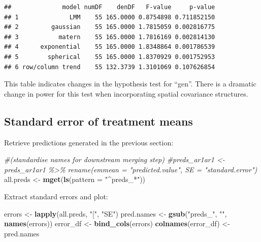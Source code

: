 \documentclass[
]{book}
\newenvironment{Shaded}{\begin{snugshade}}{\end{snugshade}}
\newcommand{\AttributeTok}[1]{\textcolor[rgb]{0.13,0.29,0.53}{#1}}
\newcommand{\CommentTok}[1]{\textcolor[rgb]{0.56,0.35,0.01}{\textit{#1}}}
\newcommand{\FunctionTok}[1]{\textcolor[rgb]{0.13,0.29,0.53}{\textbf{#1}}}
\newcommand{\NormalTok}[1]{#1}
\newcommand{\OtherTok}[1]{\textcolor[rgb]{0.56,0.35,0.01}{#1}}
\newcommand{\StringTok}[1]{\textcolor[rgb]{0.31,0.60,0.02}{#1}}
\begin{document}
\begin{verbatim}
##              model numDF    denDF   F-value     p-value
## 1              LMM    55 165.0000 0.8754898 0.711852150
## 2         gaussian    55 165.0000 1.7815059 0.002816775
## 3           matern    55 165.0000 1.7816169 0.002814130
## 4      exponential    55 165.0000 1.8348864 0.001786539
## 5        spherical    55 165.0000 1.8370929 0.001752953
## 6 row/column trend    55 132.3739 1.3101069 0.107626854
\end{verbatim}

This table indicates changes in the hypothesis test for ``gen''. There is a dramatic change in power for this test when incorporating spatial covariance structures.

\hypertarget{standard-error-of-treatment-means}{%
\subsection{Standard error of treatment means}\label{standard-error-of-treatment-means}}

Retrieve predictions generated in the previous section:

\begin{Shaded}
\begin{Highlighting}[]
\CommentTok{\#(standardise names for downstream merging step)}
\CommentTok{\#preds\_ar1ar1 \textless{}{-} preds\_ar1ar1  \%\textgreater{}\% rename(emmean = "predicted.value", SE = "standard.error") }
\NormalTok{all.preds }\OtherTok{\textless{}{-}} \FunctionTok{mget}\NormalTok{(}\FunctionTok{ls}\NormalTok{(}\AttributeTok{pattern =} \StringTok{"\^{}preds\_*"}\NormalTok{)) }
\end{Highlighting}
\end{Shaded}

Extract standard errors and plot:

\begin{Shaded}
\begin{Highlighting}[]
\NormalTok{errors }\OtherTok{\textless{}{-}} \FunctionTok{lapply}\NormalTok{(all.preds, }\StringTok{"["}\NormalTok{, }\StringTok{"SE"}\NormalTok{)}
\NormalTok{pred.names }\OtherTok{\textless{}{-}} \FunctionTok{gsub}\NormalTok{(}\StringTok{"preds\_"}\NormalTok{, }\StringTok{""}\NormalTok{, }\FunctionTok{names}\NormalTok{(errors))}
\NormalTok{error\_df }\OtherTok{\textless{}{-}} \FunctionTok{bind\_cols}\NormalTok{(errors)}
\FunctionTok{colnames}\NormalTok{(error\_df) }\OtherTok{\textless{}{-}}\NormalTok{ pred.names}
\end{Highlighting}
\end{Shaded}
\end{document}
